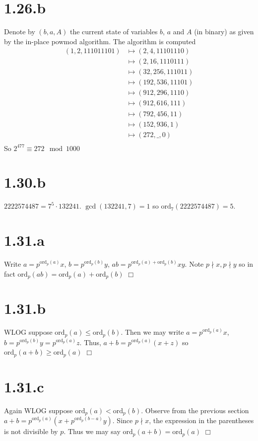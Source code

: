 \documentclass{article}
\begin{document}
\section*{1.26.b}
Denote by $(b,a,A)$ the current state of variables $b$, $a$ and $A$ (in binary) as given by the in-place powmod algorithm. The algorithm is computed
\begin{equation*}
\begin{split}
(1,2,111011101)
&\mapsto (2,4,11101110)\\
&\mapsto (2,16,1110111)\\
&\mapsto (32,256,111011)\\
&\mapsto (192,536,11101)\\
&\mapsto (912,296,1110)\\
&\mapsto (912,616,111)\\
&\mapsto (792,456,11)\\
&\mapsto (152,936,1)\\
&\mapsto (272,\_,0)\\
\end{split}
\end{equation*}
So $2^{477} \equiv 272 \mod 1000$

\section*{1.30.b}
$2222574487 = 7^5 \cdot 132241$. $\gcd(132241, 7) = 1$ so $\mathrm{ord}_7(2222574487) = 5$.

\section*{1.31.a}
Write $a = p^{\mathrm{ord}_p(a)}x$, $b = p^{\mathrm{ord}_p(b)}y$, $ab = p^{\mathrm{ord}_p(a)+\mathrm{ord}_p(b)}xy$. Note $p \nmid x, p \nmid y$ so in fact $\mathrm{ord}_p(ab) = \mathrm{ord}_p(a) + \mathrm{ord}_p(b)$ $\Box$

\section*{1.31.b}
WLOG suppose $\mathrm{ord}_p(a) \leqslant \mathrm{ord}_p(b)$. Then we may write $a = p^{\mathrm{ord}_p(a)}x$, $b = p^{\mathrm{ord}_p(b)}y = p^{\mathrm{ord}_p(a)}z$. Thus, $a + b = p^{\mathrm{ord}_p(a)}(x + z)$ so $\mathrm{ord}_p(a+b) \geq \mathrm{ord}_p(a)$ $\Box$

\section*{1.31.c}
Again WLOG suppose $\mathrm{ord}_p(a) < \mathrm{ord}_p(b)$. Observe from the previous section $a + b = p^{\mathrm{ord}_p(a)}(x + p^{\mathrm{ord}_p(b-a)}y)$. Since $p \nmid x$, the expression in the parentheses is not divisible by $p$. Thus we may say $\mathrm{ord}_p(a+b) = \mathrm{ord}_p(a)$ $\Box$
\end{document}
